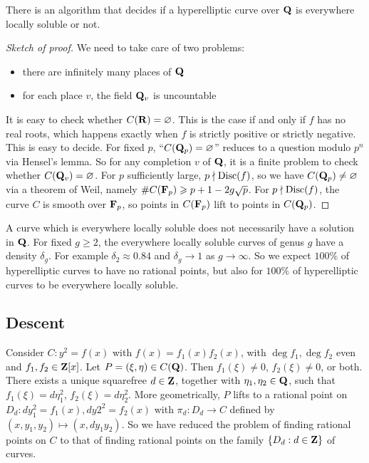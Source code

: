 \begin{prop}
There is an algorithm that decides if a hyperelliptic curve over $\mathbf{Q}$ is 
everywhere locally soluble or not. 
\end{prop}
\begin{proof}[Sketch of proof]
We need to take care of two problems: 
\begin{itemize}
  \item there are infinitely many places of $\mathbf{Q}$  
  \item for each place $v$, the field $\mathbf{Q}_v$ is uncountable 
\end{itemize}
It is easy to check whether $C(\mathbf{R})=\varnothing$. This is the case if and only 
if $f$ has no real roots, which happens exactly when $f$ is strictly positive 
or strictly negative. This is easy to decide. 
For fixed $p$, ``$C(\mathbf{Q}_p)=\varnothing$'' reduces to a question modulo $p^n$ 
via Hensel's lemma. So for any completion $v$ of $\mathbf{Q}$, it is a finite problem 
to check whether $C(\mathbf{Q}_v)=\varnothing$. For $p$ sufficiently large, 
$p\nmid\operatorname{Disc}(f)$, so we have $C(\mathbf{Q}_p)\ne\varnothing$ via a theorem of 
Weil, namely $\#C(\mathbf{F}_p)\geqslant p+1-2 g\sqrt p$. For 
$p\nmid\operatorname{Disc}(f)$, the curve $C$ is smooth over $\mathbf{F}_p$, so points in 
$C(\mathbf{F}_p)$ lift to points in $C(\mathbf{Q}_p)$. 
\end{proof}

A curve which is everywhere locally soluble does not necessarily have a 
solution in $\mathbf{Q}$. For fixed $g\geqslant 2$, the everywhere locally soluble 
curves of genus $g$ have a density $\delta_g$. For example 
$\delta_2\approx 0.84$ and $\delta_g\to 1$ as $g\to \infty$. So we expect 
$100\%$ of hyperelliptic curves to have no rational points, but also for 
$100\%$ of hyperelliptic curves to be everywhere locally soluble. 





\subsection{Descent}

Consider $C:y^2=f(x)$ with $f(x)=f_1(x) f_2(x)$, with 
$\deg f_1,\deg f_2$ even and $f_1,f_2\in \mathbf{Z}[x]$. Let $P=(\xi,\eta)\in C(\mathbf{Q})$. 
Then $f_1(\xi)\ne 0$, $f_2(\xi)\ne0$, or both. There exists a unique squarefree 
$d\in \mathbf{Z}$, together with $\eta_1,\eta_2\in \mathbf{Q}$, such that 
$f_1(\xi) = d\eta_1^2$, $f_2(\xi) = d\eta_2^2$. More geometrically, $P$ lifts 
to a rational point on $D_d:d y_1^2 = f_1(x),d y2^2=f_2(x)$ with 
$\pi_d:D_d\to C$ defined by $(x,y_1,y_2)\mapsto (x,d y_1 y_2)$. So we have 
reduced the problem of finding rational points on $C$ to that of finding 
rational points on the family $\{D_d:d\in \mathbf{Z}\}$ of curves. 

